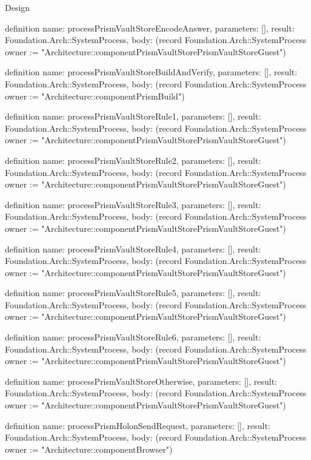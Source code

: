\begin{lexlean}{Design}
\begin{semanticmodule}
definition{
  name: processPrismVaultStoreEncodeAnswer,
  parameters: [],
  result: Foundation.Arch::SystemProcess,
  body: (record Foundation.Arch::SystemProcess {owner := "Architecture::componentPrismVaultStorePrismVaultStoreGuest"})
}

definition{
  name: processPrismVaultStoreBuildAndVerify,
  parameters: [],
  result: Foundation.Arch::SystemProcess,
  body: (record Foundation.Arch::SystemProcess {owner := "Architecture::componentPrismBuild"})
}

definition{
  name: processPrismVaultStoreRule1,
  parameters: [],
  result: Foundation.Arch::SystemProcess,
  body: (record Foundation.Arch::SystemProcess {owner := "Architecture::componentPrismVaultStorePrismVaultStoreGuest"})
}

definition{
  name: processPrismVaultStoreRule2,
  parameters: [],
  result: Foundation.Arch::SystemProcess,
  body: (record Foundation.Arch::SystemProcess {owner := "Architecture::componentPrismVaultStorePrismVaultStoreGuest"})
}

definition{
  name: processPrismVaultStoreRule3,
  parameters: [],
  result: Foundation.Arch::SystemProcess,
  body: (record Foundation.Arch::SystemProcess {owner := "Architecture::componentPrismVaultStorePrismVaultStoreGuest"})
}

definition{
  name: processPrismVaultStoreRule4,
  parameters: [],
  result: Foundation.Arch::SystemProcess,
  body: (record Foundation.Arch::SystemProcess {owner := "Architecture::componentPrismVaultStorePrismVaultStoreGuest"})
}

definition{
  name: processPrismVaultStoreRule5,
  parameters: [],
  result: Foundation.Arch::SystemProcess,
  body: (record Foundation.Arch::SystemProcess {owner := "Architecture::componentPrismVaultStorePrismVaultStoreGuest"})
}

definition{
  name: processPrismVaultStoreRule6,
  parameters: [],
  result: Foundation.Arch::SystemProcess,
  body: (record Foundation.Arch::SystemProcess {owner := "Architecture::componentPrismVaultStorePrismVaultStoreGuest"})
}

definition{
  name: processPrismVaultStoreOtherwise,
  parameters: [],
  result: Foundation.Arch::SystemProcess,
  body: (record Foundation.Arch::SystemProcess {owner := "Architecture::componentPrismVaultStorePrismVaultStoreGuest"})
}

definition{
  name: processPrismHolonSendRequest,
  parameters: [],
  result: Foundation.Arch::SystemProcess,
  body: (record Foundation.Arch::SystemProcess {owner := "Architecture::componentBrowser"})
}


\end{semanticmodule}
\end{lexlean}
